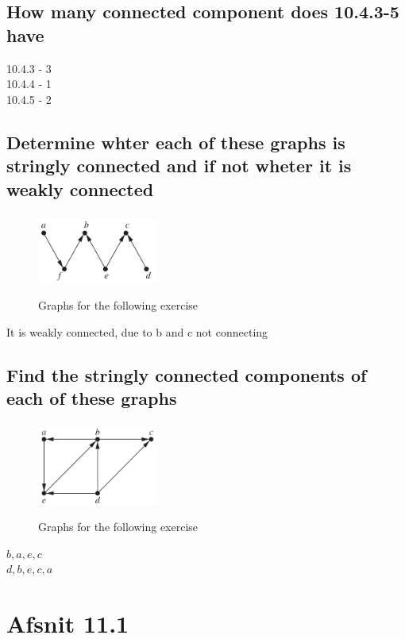 \documentclass[12pt, a4paper]{report}
\begin{document}
		\subsection{How many connected component does 10.4.3-5 have}
			10.4.3 - 3\\
			10.4.4 - 1\\
			10.4.5 - 2
		\setcounter{subsection}{11}
		\subsection{Determine whter each of these graphs is stringly connected and if not wheter it is weakly connected}
			\subsubsection{}
				\begin{figure}[h!]
					\centering
					\includegraphics[width=150px]{assets/10,4,12,a.png}
					\label{}
				\caption{Graphs for the following exercise}
				\end{figure}
				It is weakly connected, due to b and c not connecting	
		\setcounter{subsection}{13}
		\subsection{Find the stringly connected components of each of these graphs}
			\subsubsection{}
				\begin{figure}[h!]
					\centering
					\includegraphics[width=150px]{assets/10,4,14,a.png}
					\label{}
				\caption{Graphs for the following exercise}
				\end{figure}
				$b,a,e,c$\\
				$d,b,e,c,a$
	\section{Afsnit 11.1}
\end{document}

